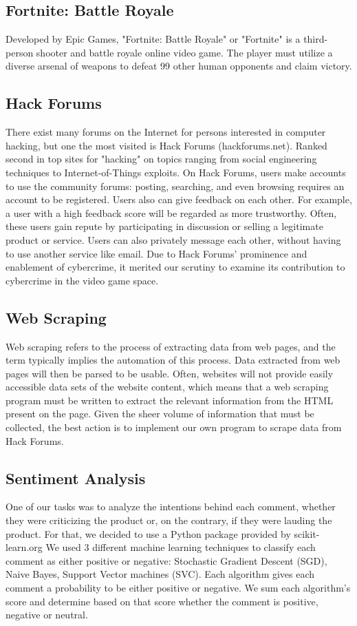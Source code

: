 \documentclass[sigconf]{acmart}
\begin{document}
\subsection{Fortnite: Battle Royale}
Developed by Epic Games, "Fortnite: Battle Royale" or "Fortnite" is a 
third-person shooter and battle royale online video game. The player must
utilize a diverse arsenal of weapons to defeat 99 other human opponents and 
claim victory. 

\subsection{Hack Forums}
There exist many forums on the Internet for persons interested in computer
hacking, but one the most visited is Hack Forums (hackforums.net). Ranked
second in top sites for "hacking" %
on topics ranging from social engineering techniques to Internet-of-Things 
exploits. On Hack Forums, users make accounts to use the community forums:
posting, searching, and even browsing requires an account to be registered.
Users also can give feedback on each other. For example, a user with
a high feedback score will be regarded as more trustworthy. Often, these users
gain repute by participating in discussion or selling a legitimate product or 
service. Users can also privately message each other, without having to use
another service like email. Due to Hack Forums' prominence and enablement of 
cybercrime, it merited our scrutiny to examine its contribution to cybercrime
in the video game space. 

\subsection{Web Scraping}
Web scraping refers to the process of extracting data from web pages, and the 
term typically implies the automation of this process. Data extracted from web
pages will then be parsed to be usable. Often, websites will not provide 
easily accessible data sets of the website content, which means that a 
web scraping program must be written to extract the relevant information from
the HTML present on the page. Given the sheer volume of information that must
be collected, the best action is to implement our own program to scrape data 
from Hack Forums.

\subsection{Sentiment Analysis}
One of our tasks was to analyze the intentions behind each comment, whether
they were criticizing the product or, on the contrary, if they were lauding
the product. For that, we decided to use a Python package provided by scikit-learn.org
We used 3 different machine learning techniques to classify each comment as
either positive or negative: Stochastic Gradient Descent (SGD), Naive Bayes, 
Support Vector machines (SVC). Each algorithm gives each comment a probability to be either positive or negative. We sum each algorithm's score and determine based on that score whether the comment is positive, negative or neutral.
\end{document}
